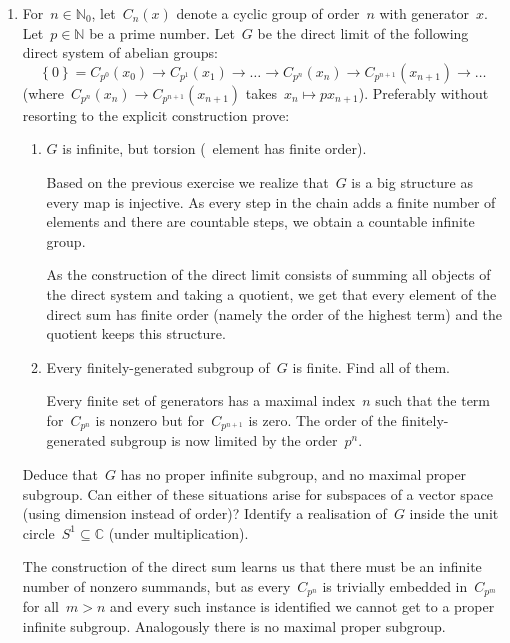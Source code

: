\documentclass[a4paper,11pt,oneside,openany,article]{memoir}
\begin{document}
\begin{enumerate}
  \item For~$n\in\mathbb{N}_0$, let~$C_n(x)$ denote a cyclic group of order~$n$ with generator~$x$. Let~$p\in\mathbb{N}$ be a prime number. Let~$G$ be the direct limit of the following direct system of abelian groups:
    \begin{equation}
      \left\{ 0 \right\}=C_{p^0}(x_0)\rightarrow C_{p^1}(x_1)\rightarrow\ldots\rightarrow C_{p^n}(x_n)\rightarrow C_{p^{n+1}}(x_{n+1})\rightarrow\ldots
    \end{equation}
    (where~$C_{p^n}(x_n)\rightarrow C_{p^{n+1}}(x_{n+1})$ takes~$x_n\mapsto px_{n+1}$). Preferably without resorting to the explicit construction prove:
    \begin{enumerate}
      \item $G$ is infinite, but torsion (\ie~element has finite order).

        \begin{solution}
          Based on the previous exercise we realize that~$G$ is a big structure as every map is injective. As every step in the chain adds a finite number of elements and there are countable steps, we obtain a countable infinite group.

          As the construction of the direct limit consists of summing all objects of the direct system and taking a quotient, we get that every element of the direct sum has finite order (namely the order of the highest term) and the quotient keeps this structure.
        \end{solution}

      \item Every finitely-generated subgroup of~$G$ is finite. Find all of them.

        \begin{solution}
          Every finite set of generators has a maximal index~$n$ such that the term for~$C_{p^n}$ is nonzero but for~$C_{p^{n+1}}$ is zero. The order of the finitely-generated subgroup is now limited by the order~$p^n$.
        \end{solution}
    \end{enumerate}

    Deduce that~$G$ has no proper infinite subgroup, and no maximal proper subgroup. Can either of these situations arise for subspaces of a vector space (using dimension instead of order)? Identify a realisation of~$G$ inside the unit circle~$S^1\subseteq\mathbb{C}$ (under multiplication).

    \begin{solution}
      The construction of the direct sum learns us that there must be an infinite number of nonzero summands, but as every~$C_{p^n}$ is trivially embedded in~$C_{p^m}$ for all~$m>n$ and every such instance is identified we cannot get to a proper infinite subgroup. Analogously there is no maximal proper subgroup.


\end{solution}
\end{enumerate}
\end{document}

